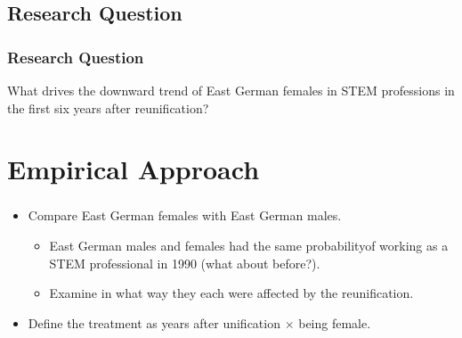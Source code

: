 \documentclass[11pt, aspectratio=1610, xcolor={dvipsnames}]{beamer}
\begin{document}
	\subsection{Research Question}
	\begin{frame}
		\frametitle{Research Question}
		
		What drives the downward trend of East German females in STEM professions in the first six years after reunification?
		
	\end{frame}
	
	\section{Empirical Approach}
	\begin{frame}
		\frametitle{}
		
		\begin{itemize}
			\item Compare East German females with East German males.
			\begin{itemize}
				\item East German males and females had the same probability\linebreak of working as a STEM professional in 1990 (what about before?).
				\item Examine in what way they each were affected by the reunification.
			\end{itemize}
			\item Define the treatment as \textcolor{PineGreen}{years after unification $\times$ being female}.
		\end{itemize}
		
		
	\end{frame}
\end{document}
